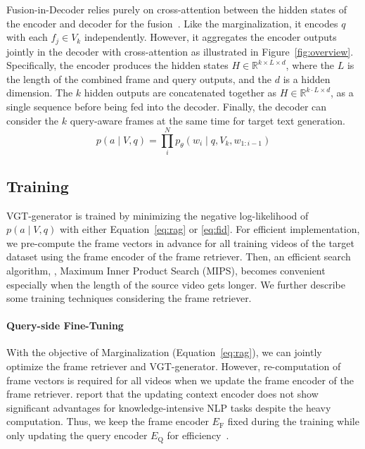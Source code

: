 \documentclass{article}
\begin{document}
Fusion-in-Decoder relies purely on cross-attention between the hidden states of the encoder and decoder for the fusion~\cite{izacard2021leveraging}. Like the marginalization, it encodes $q$ with each $f_j \in V_k$ independently. However, it aggregates the encoder outputs jointly in the decoder with cross-attention as illustrated in Figure~\ref{fig:overview}. Specifically, the encoder produces the hidden states $H \in \mathbb{R}^{k \times L \times d}$, where the $L$ is the length of the combined frame and query outputs, and the $d$ is a hidden dimension. The $k$ hidden outputs are concatenated together as $H \in \mathbb{R}^{k \cdot L \times d}$, as a single sequence before being fed into the decoder. Finally, the decoder can consider the $k$ query-aware frames at the same time for target text generation.
\begin{equation}
    p(a \mid V, q) = \prod_i^N p_{\theta}(w_i \mid q, V_k, w_{1:i-1})
    \label{eq:fid}
\end{equation}

\subsection{Training}
\label{sec:sevit_training}

VGT-generator is trained by minimizing the negative log-likelihood of $p(a \mid V, q)$ with either Equation~\ref{eq:rag} or \ref{eq:fid}. For efficient implementation, we pre-compute the frame vectors in advance for all training videos of the target dataset using the frame encoder of the frame retriever. Then, an efficient search algorithm, \ie, Maximum Inner Product Search (MIPS), becomes convenient especially when the length of the source video gets longer.
We further describe some training techniques considering the frame retriever.

\paragraph{Query-side Fine-Tuning}

With the objective of Marginalization (Equation~\ref{eq:rag}), we can jointly optimize the frame retriever and VGT-generator. However, re-computation of frame vectors is required for all videos when we update the frame encoder of the frame retriever. \citet{lewis2020retrieval, izacard2022few} report that the updating context encoder does not show significant advantages for knowledge-intensive NLP tasks despite the heavy computation. Thus, we keep the frame encoder $E_\text{F}$ fixed during the training while only updating the query encoder $E_\text{Q}$ for efficiency~\cite{lewis2020retrieval, izacard2022few}.
\end{document}
